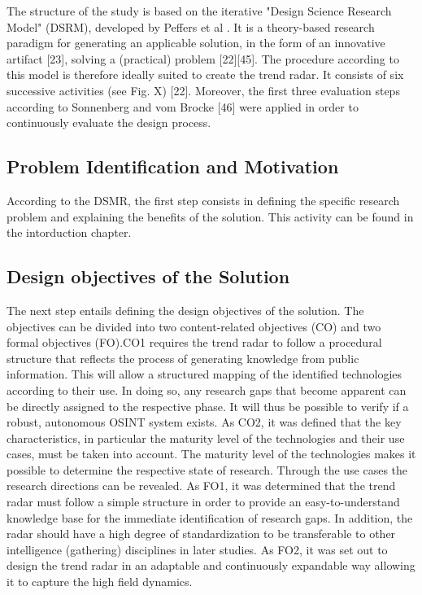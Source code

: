 \documentclass[10pt]{article}
\begin{document}
The structure of the study is based on the iterative "Design Science Research Model" (DSRM),
developed by Peffers et al \cite{Peffers.2007}. It is a theory-based research paradigm for generating an
applicable solution, in the form of an innovative artifact [23], solving a (practical)
problem [22][45]. The procedure according to this model is therefore ideally suited to
create the trend radar. It consists of six successive activities (see Fig. X) [22].
Moreover, the first three evaluation steps according to Sonnenberg and vom Brocke [46]
were applied in order to continuously evaluate the design process.

\subsection{Problem Identification and Motivation}

According to the DSMR, the first step consists in defining the
specific research problem and explaining the benefits of the solution.
This activity can be found in the intorduction chapter.

\subsection{Design objectives of the Solution}

The next step entails defining the design objectives of the solution. The
objectives can be divided into two content-related objectives (CO) and
two formal objectives (FO).CO1 requires the trend radar to follow a procedural
structure that reflects the process of generating knowledge from
public information. This will allow a structured mapping of the
identified technologies according to their use. In doing so, any
research gaps that become apparent can be directly assigned to the
respective phase. It will thus be possible to verify if a robust,
autonomous OSINT system exists. As CO2, it was defined that the key
characteristics, in particular the maturity level of the technologies
and their use cases, must be taken into account. The maturity level of
the technologies makes it possible to determine the respective state
of research. Through the use cases the research directions can be
revealed. As FO1, it was determined that the trend radar must follow
a simple structure in order to provide an easy-to-understand knowledge
base for the immediate identification of research gaps. In addition,
the radar should have a high degree of standardization to be
transferable to other intelligence (gathering) disciplines in later
studies. As FO2, it was set out to design the trend radar in an
adaptable and continuously expandable way allowing it to capture the
high field dynamics.
\end{document}
